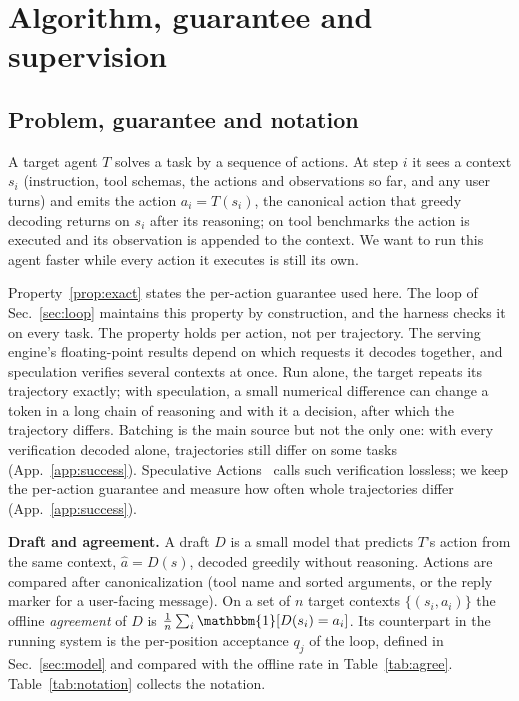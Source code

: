 \section{Algorithm, guarantee and supervision}
\label{app:method}
\subsection{Problem, guarantee and notation}
\label{app:detail:problem}
A target agent $T$ solves a task by a sequence of actions. At step $i$ it sees a context $s_i$
(instruction, tool schemas, the actions and observations so far, and any user turns) and emits the action
$a_i = T(s_i)$, the canonical action that greedy decoding returns on $s_i$ after its reasoning; on tool benchmarks the action is
executed and its observation is appended to the context. We want to run this agent faster while every
action it executes is still its own.

Property~\ref{prop:exact} states the per-action guarantee used here.
The loop of Sec.~\ref{sec:loop} maintains this property by construction, and the harness checks it on every
task. The property holds per action, not per trajectory. The serving engine's floating-point results depend on
which requests it decodes together, and speculation verifies several contexts at once. Run alone, the target
repeats its trajectory exactly; with speculation, a small numerical difference can change a token in a long
chain of reasoning and with it a decision, after which the trajectory differs. Batching is the main source but not
the only one: with every verification decoded alone, trajectories still differ on some tasks (App.~\ref{app:success}).
Speculative Actions~\citep{specactions} calls such verification lossless; we keep the per-action guarantee and measure how
often whole trajectories differ (App.~\ref{app:success}).

\textbf{Draft and agreement.} A draft $D$ is a small model that predicts $T$'s action from the same
context, $\hat a = D(s)$, decoded greedily without reasoning. Actions are compared after
canonicalization (tool name and sorted arguments, or the reply marker for a user-facing message). On a set
of $n$ target contexts $\{(s_i, a_i)\}$ the offline \emph{agreement} of $D$ is
$\frac{1}{n}\sum_{i}\mathbbm{1}[D(s_i) = a_i]$. Its counterpart in the running system is the
per-position acceptance $q_j$ of the loop, defined in Sec.~\ref{sec:model} and compared with the offline
rate in Table~\ref{tab:agree}. Table~\ref{tab:notation} collects the notation.

